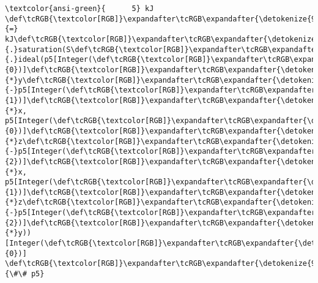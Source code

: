 \documentclass[11pt]{article}
\begin{document}
\begin{Verbatim}[commandchars=\\\{\}, frame=single, framerule=2mm, rulecolor=\color{outerrorbackground}]
\textcolor{ansi-green}{      5} kJ \def\tcRGB{\textcolor[RGB]}\expandafter\tcRGB\expandafter{\detokenize{98,98,98}}{=} kJ\def\tcRGB{\textcolor[RGB]}\expandafter\tcRGB\expandafter{\detokenize{98,98,98}}{.}saturation(S\def\tcRGB{\textcolor[RGB]}\expandafter\tcRGB\expandafter{\detokenize{98,98,98}}{.}ideal(p5[Integer(\def\tcRGB{\textcolor[RGB]}\expandafter\tcRGB\expandafter{\detokenize{98,98,98}}{0})]\def\tcRGB{\textcolor[RGB]}\expandafter\tcRGB\expandafter{\detokenize{98,98,98}}{*}y\def\tcRGB{\textcolor[RGB]}\expandafter\tcRGB\expandafter{\detokenize{98,98,98}}{-}p5[Integer(\def\tcRGB{\textcolor[RGB]}\expandafter\tcRGB\expandafter{\detokenize{98,98,98}}{1})]\def\tcRGB{\textcolor[RGB]}\expandafter\tcRGB\expandafter{\detokenize{98,98,98}}{*}x, p5[Integer(\def\tcRGB{\textcolor[RGB]}\expandafter\tcRGB\expandafter{\detokenize{98,98,98}}{0})]\def\tcRGB{\textcolor[RGB]}\expandafter\tcRGB\expandafter{\detokenize{98,98,98}}{*}z\def\tcRGB{\textcolor[RGB]}\expandafter\tcRGB\expandafter{\detokenize{98,98,98}}{-}p5[Integer(\def\tcRGB{\textcolor[RGB]}\expandafter\tcRGB\expandafter{\detokenize{98,98,98}}{2})]\def\tcRGB{\textcolor[RGB]}\expandafter\tcRGB\expandafter{\detokenize{98,98,98}}{*}x, p5[Integer(\def\tcRGB{\textcolor[RGB]}\expandafter\tcRGB\expandafter{\detokenize{98,98,98}}{1})]\def\tcRGB{\textcolor[RGB]}\expandafter\tcRGB\expandafter{\detokenize{98,98,98}}{*}z\def\tcRGB{\textcolor[RGB]}\expandafter\tcRGB\expandafter{\detokenize{98,98,98}}{-}p5[Integer(\def\tcRGB{\textcolor[RGB]}\expandafter\tcRGB\expandafter{\detokenize{98,98,98}}{2})]\def\tcRGB{\textcolor[RGB]}\expandafter\tcRGB\expandafter{\detokenize{98,98,98}}{*}y))[Integer(\def\tcRGB{\textcolor[RGB]}\expandafter\tcRGB\expandafter{\detokenize{98,98,98}}{0})] \def\tcRGB{\textcolor[RGB]}\expandafter\tcRGB\expandafter{\detokenize{95,135,135}}{\#\# p5}

\end{Verbatim}
\end{document}
